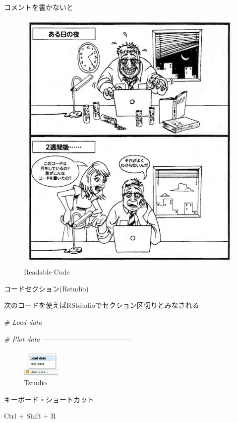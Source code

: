 \documentclass[ignorenonframetext,]{beamer}
\newenvironment{Shaded}{\begin{snugshade}}{\end{snugshade}}
\newcommand{\CommentTok}[1]{\textcolor[rgb]{0.56,0.35,0.01}{\textit{#1}}}
\begin{document}
\begin{frame}{コメントを書かないと}

\begin{figure}
\centering
\includegraphics{../img/2018-1-2-9-readable-code.png}
\caption{Readable Code}
\end{figure}

\end{frame}

\begin{frame}[fragile]{コードセクション(Rstudio)}

次のコードを使えばRStdudioでセクション区切りとみなされる

\begin{Shaded}
\begin{Highlighting}[]
\CommentTok{# Load data --------------------------------------}

\CommentTok{# Plot data --------------------------------------}
\end{Highlighting}
\end{Shaded}

\begin{figure}
\centering
\includegraphics[width=0.72917in]{../img/rstudio-nav.png}
\caption{Tstudio}
\end{figure}

\begin{block}{キーボード・ショートカット}

Ctrl + Shift + R

\end{block}

\end{frame}
\end{document}

